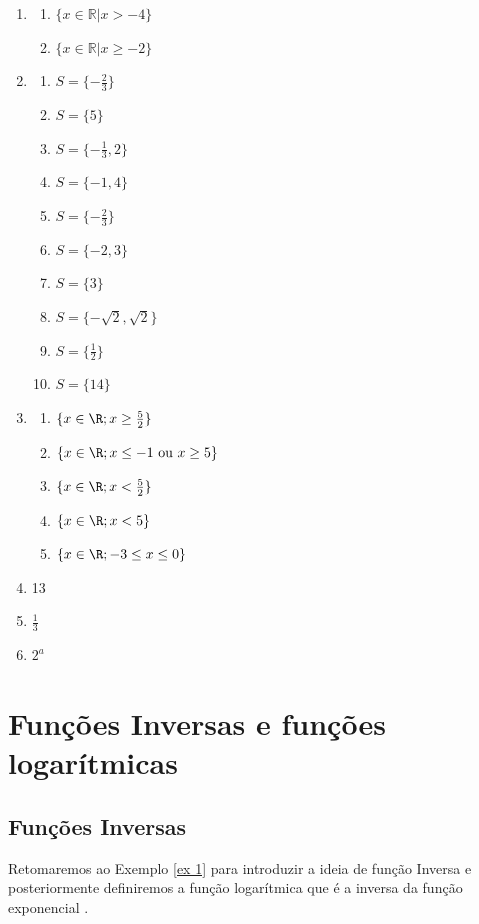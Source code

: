 \begin{enumerate}
			\item
			\begin{enumerate}
			    \item $\{ x \in \mathbb{R}| x> -4 \}$
			    \item $\{ x \in \mathbb{R}| x \geq -2 \}$
			\end{enumerate}
			\item 	\begin{enumerate}
				\item $S=\{-\frac{2}{3} \}$
				\item $S=\{5\}$
				\item $S=\{-\frac{1}{3},2\}$
				\item $S=\{-1,4\}$
				\item $S=\{-\frac{2}{3}\}$
				\item $S=\{-2,3\}$
				\item   $S=\{3 \}$
				 \item $S=\{-\sqrt{2},\sqrt{2}\}$
				 \item  $S=\{\frac{1}{2}\}$
				 \item   $S=\{14 \}$
			\end{enumerate}
				\item
		\begin{enumerate}
			\item $\{x\in\R; x\geq \frac{5}{2}\}$
			\item $\{x\in\R; x\leq -1\mbox{ ou } x\geq 5\}$
			\item  $\{x\in\R; x< \frac{5}{2}\}$
			\item $\{x\in\R; x < 5\}$
            \item $\{x\in\R; -3 \leq x \leq 0\}$
		\end{enumerate}
			\item 13
			\item $\frac{1}{3}$
			\item $2^a$
		\end{enumerate}




\chapter{Funções Inversas e funções logarítmicas}
\section{Funções Inversas}

Retomaremos ao Exemplo \ref{ex 1} para introduzir a ideia de função Inversa e posteriormente definiremos a função logarítmica que é a inversa da função exponencial .

